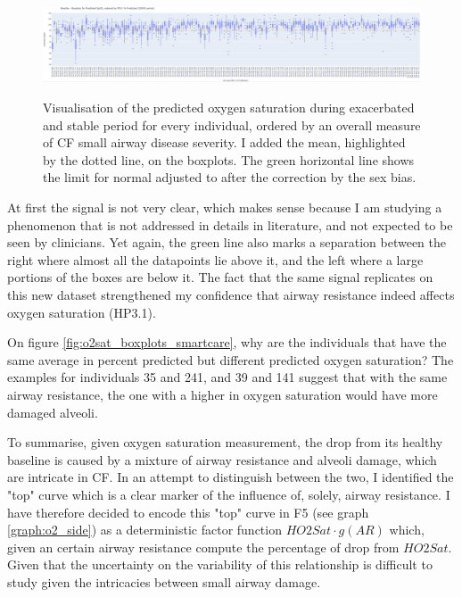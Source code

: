 \begin{figure}[!h]
    \caption{Visualisation of the predicted oxygen saturation during exacerbated and stable period for every individual, ordered by an overall measure of CF small airway disease severity. I added the mean, highlighted by the dotted line, on the boxplots. The green horizontal line shows the limit for normal \SP adjusted to after the correction by the sex bias.}
    \centering
    \includegraphics[width=150mm]{Chapter1/Figs/o2sat_boxplots_breathe.png}
    \label{fig:o2sat_boxplots_breathe}
\end{figure}

At first the signal is not very clear, which makes sense because I am studying a phenomenon that is not addressed in details in literature, and not expected to be seen by clinicians. Yet again, the green line also marks a separation between the right where almost all the datapoints lie above it, and the left where a large portions of the boxes are below it. The fact that the same signal replicates on this new dataset strengthened my confidence that airway resistance indeed affects oxygen saturation (HP3.1). 

On figure  \ref{fig:o2sat_boxplots_smartcare}, why are the individuals that have the same average \F in percent predicted but different predicted oxygen saturation? The examples for individuals 35 and 241, and 39 and 141 suggest that with the same airway resistance, the one with a higher in oxygen saturation would have more damaged alveoli. 

To summarise,  given oxygen saturation measurement, the drop from its healthy baseline is caused by a mixture of airway resistance and alveoli damage, which are intricate in CF. In an attempt to distinguish between the two, I identified the "top" curve which is a clear marker of the influence of, solely, airway resistance. I have therefore decided to encode this "top" curve in F5 (see graph \ref{graph:o2_side}) as a deterministic factor function $HO2Sat\cdot g(AR)$ which, given an certain airway resistance compute the percentage of drop from $HO2Sat$. Given that the uncertainty on the variability of this relationship is difficult to study given the intricacies between small airway damage.

